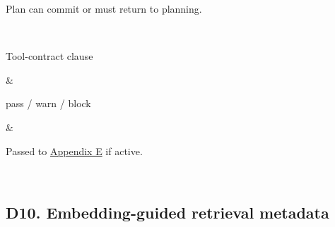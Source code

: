 {\begin{longtable}
\begin{minipage}[t]{\linewidth}
Plan can commit or must return to planning.
\end{minipage} \\
\hline
\begin{minipage}[t]{\linewidth}\RaggedRight\hspace{0pt}
Tool-contract clause
\end{minipage} & \begin{minipage}[t]{\linewidth}\RaggedRight\hspace{0pt}
pass /\allowbreak{} warn /\allowbreak{} block
\end{minipage} & \begin{minipage}[t]{\linewidth}\RaggedRight\hspace{0pt}
Passed to \hyperref[app:e]{Appendix E} if active.
\end{minipage} \\
\end{longtable}
}

\subsection{\texorpdfstring{\textbf{D10. Embedding-guided retrieval metadata}}{D10. Embedding-guided retrieval metadata}}\label{d10.-embedding-guided-retrieval-metadata}

